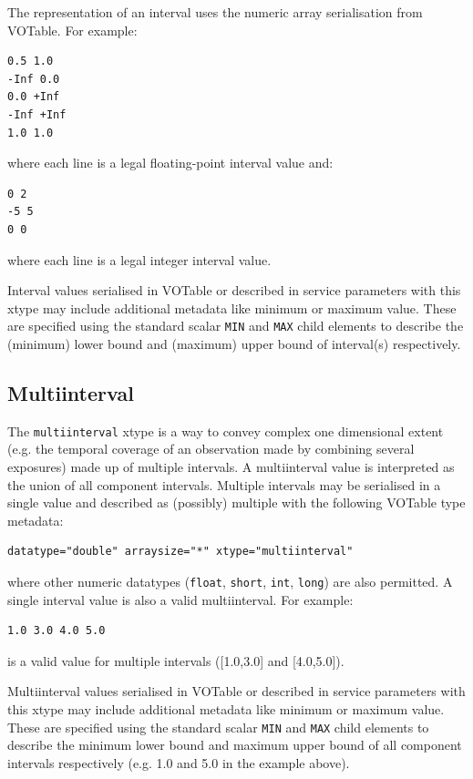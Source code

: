 \documentclass[11pt,letter]{ivoa}
\begin{document}
The representation of an interval uses the numeric array serialisation from
VOTable. For example:

\begin{verbatim}
0.5 1.0
-Inf 0.0
0.0 +Inf
-Inf +Inf
1.0 1.0
\end{verbatim}
\noindent where each line is a legal floating-point interval value and:

\begin{verbatim}
0 2
-5 5
0 0
\end{verbatim}
\noindent  where each line is a legal integer interval value.

Interval values serialised in VOTable or described in service parameters
with this xtype may include additional metadata like minimum
or maximum value. These are specified using the standard scalar \verb|MIN| and
\verb|MAX| child elements to describe the (minimum) lower bound and (maximum)
upper bound of interval(s) respectively.

\subsection{Multiinterval}
The \verb|multiinterval| xtype is a way to convey complex one dimensional extent
(e.g. the temporal coverage of an observation made by combining several exposures)
made up of multiple intervals. A multiinterval value is interpreted as the union
of all component intervals. Multiple intervals may be serialised in a single value and
described as (possibly) multiple with the following VOTable type metadata:

\begin{verbatim}
datatype="double" arraysize="*" xtype="multiinterval"
\end{verbatim}
\noindent where other numeric datatypes (\verb|float|, \verb|short|, \verb|int|, \verb|long|)
are also permitted. A single interval value is also a valid multiinterval. For example:

\begin{verbatim}
1.0 3.0 4.0 5.0
\end{verbatim}
\noindent is a valid value for multiple intervals ([1.0,3.0] and [4.0,5.0]).

Multiinterval values serialised in VOTable or described in service parameters
with this xtype may include additional metadata like minimum
or maximum value. These are specified using the standard scalar \verb|MIN| and
\verb|MAX| child elements to describe the minimum lower bound and maximum
upper bound of all component intervals respectively (e.g. 1.0 and 5.0 in the example
above).
\end{document}
